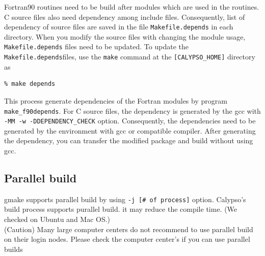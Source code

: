Fortran90 routines need to be build after modules which are used in the routines. C source files also need dependency among include files. Consequently, list of dependency of source files are saved in the file \verb|Makefile.depends| in each directory. When you modify the source files with changing the module usage,  \verb|Makefile.depends| files need to be updated. To update the  \verb|Makefile.depends|files, use the  \verb|make| command at the \verb|[CALYPSO_HOME]| directory as \\
%
\begin{verbatim}
% make depends
\end{verbatim}

This process generate dependencies of the Fortran modules by program \verb|make_f90depends|. For C source files, the dependency is generated by the gcc with \verb|-MM -w -DDEPENDENCY_CHECK| option. Consequently, the dependencies need to be generated by the environment with gcc or compatible compiler. After generating the dependency, you can transfer the modified package and build without using gcc.

\subsection{Parallel build}
gmake supports parallel build by using {\tt -j [\# of process]} option. Calypso's build process supports purallel build. it may reduce the compile time. (We checked on Ubuntu and Mac OS.) \\
{\color{red} (Caution) Many large computer centers do not recommend to use parallel build on their login nodes. Please check the computer center's if you can use parallel builds}


